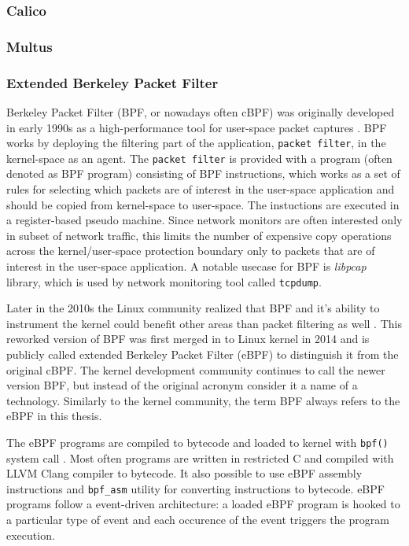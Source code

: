 \documentclass[english,12pt,a4paper,pdftex,sci,utf8]{aaltothesis}
\begin{document}
\subsubsection{Calico}


\subsubsection{Multus}

\subsubsection{Extended Berkeley Packet Filter}

Berkeley Packet Filter (BPF, or nowadays often cBPF) was originally developed in early 1990s as a high-performance tool for user-space packet captures \cite{mccanne1993bsd}. BPF works by deploying the filtering part of the application, \texttt{packet filter}, in the kernel-space as an agent. The \texttt{packet filter} is provided with a program (often denoted as BPF program) consisting of BPF instructions, which works as a set of rules for selecting which packets are of interest in the user-space application and should be copied from kernel-space to user-space. The instuctions are executed in a register-based pseudo machine. Since network monitors are often interested only in subset of network traffic, this limits the number of expensive copy operations across the kernel/user-space protection boundary only to packets that are of interest in the user-space application. A notable usecase for BPF is \textit{libpcap} library, which is used by network monitoring tool called \texttt{tcpdump}.

Later in the 2010s the Linux community realized that BPF and it's ability to instrument the kernel could benefit other areas than packet filtering as well \cite{vieira2020fast}. This reworked version of BPF was first merged in to Linux kernel in 2014 and is publicly called extended Berkeley Packet Filter (eBPF) to distinguish it from the original cBPF. The kernel development community continues to call the newer version BPF, but instead of the original acronym consider it a name of a technology. Similarly to the kernel community, the term BPF always refers to the eBPF in this thesis.

The eBPF programs are compiled to bytecode and loaded to kernel with \texttt{bpf()} system call \cite{miano2021framework}. Most often programs are written in restricted C and compiled with LLVM Clang compiler to bytecode. It also possible to use eBPF assembly instructions and \texttt{bpf\_asm} utility for converting instructions to bytecode. eBPF programs follow a event-driven architecture: a loaded eBPF program is hooked to a particular type of event and each occurence of the event triggers the program execution.
\end{document}
